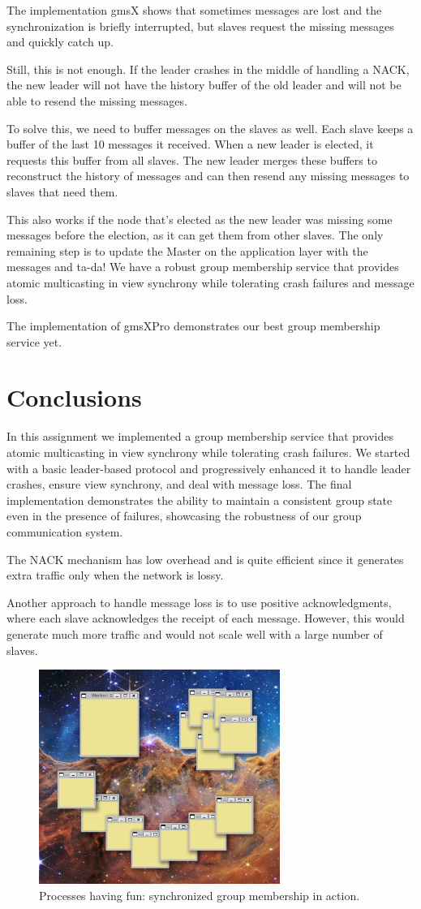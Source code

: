 \documentclass[a4paper, 11pt]{article}
\begin{document}
The implementation gmsX shows that sometimes messages are lost and the synchronization is briefly interrupted, but slaves request the missing messages and quickly catch up.

Still, this is not enough. If the leader crashes in the middle of handling a NACK, the new leader will not have the history buffer of the old leader and will not be able to resend the missing messages.

To solve this, we need to buffer messages on the slaves as well. Each slave keeps a buffer of the last 10 messages it received. When a new leader is elected, it requests this buffer from all slaves. The new leader merges these buffers to reconstruct the history of messages and can then resend any missing messages to slaves that need them.

This also works if the node that's elected as the new leader was missing some messages before the election, as it can get them from other slaves. The only remaining step is to update the Master on the application layer with the messages and ta-da! We have a robust group membership service that provides atomic multicasting in view synchrony while tolerating crash failures and message loss.

The implementation of gmsXPro demonstrates our best group membership service yet.

\section{Conclusions}

In this assignment we implemented a group membership service that provides atomic multicasting in view synchrony while tolerating crash failures. We started with a basic leader-based protocol and progressively enhanced it to handle leader crashes, ensure view synchrony, and deal with message loss. The final implementation demonstrates the ability to maintain a consistent group state even in the presence of failures, showcasing the robustness of our group communication system.

The NACK mechanism has low overhead and is quite efficient since it generates extra traffic only when the network is lossy.

Another approach to handle message loss is to use positive acknowledgments, where each slave acknowledges the receipt of each message. However, this would generate much more traffic and would not scale well with a large number of slaves.

\begin{figure}[H]
  \centering
  \includegraphics[width=0.7\textwidth]{imgs/processes_having_fun.png}
  \caption{Processes having fun: synchronized group membership in action.}
  \label{fig:processes_having_fun}
\end{figure}
\end{document}
